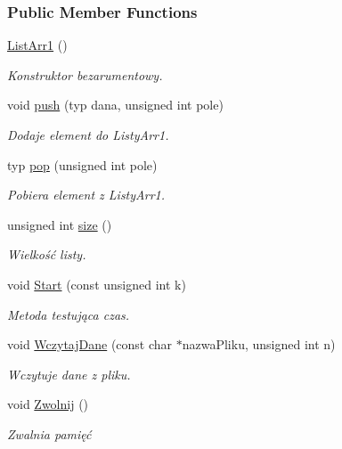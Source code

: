 \subsubsection*{Public Member Functions}
\begin{DoxyCompactItemize}
\item 
\hyperlink{class_list_arr1_adb0efe7b437d19a3cc7325b379f573bb}{List\-Arr1} ()
\begin{DoxyCompactList}\small\item\em Konstruktor bezarumentowy. \end{DoxyCompactList}\item 
void \hyperlink{class_list_arr1_a9b8bfbeae4e0b93ab47398d0282447b5}{push} (typ dana, unsigned int pole)
\begin{DoxyCompactList}\small\item\em Dodaje element do Listy\-Arr1. \end{DoxyCompactList}\item 
typ \hyperlink{class_list_arr1_acbc2f02d8ee4389cfd202beeddfae82c}{pop} (unsigned int pole)
\begin{DoxyCompactList}\small\item\em Pobiera element z Listy\-Arr1. \end{DoxyCompactList}\item 
unsigned int \hyperlink{class_list_arr1_a42b97b706c07e85f866bafd6ebc9b440}{size} ()
\begin{DoxyCompactList}\small\item\em Wielkość listy. \end{DoxyCompactList}\item 
void \hyperlink{class_list_arr1_a3af86b6f1d64d7a818faa726b83eb7e2}{Start} (const unsigned int k)
\begin{DoxyCompactList}\small\item\em Metoda testująca czas. \end{DoxyCompactList}\item 
void \hyperlink{class_list_arr1_a0a059d167f26e2498f3f4827f81841da}{Wczytaj\-Dane} (const char $\ast$nazwa\-Pliku, unsigned int n)
\begin{DoxyCompactList}\small\item\em Wczytuje dane z pliku. \end{DoxyCompactList}\item 
void \hyperlink{class_list_arr1_a613d2338847bd5d3b1383892d74280e7}{Zwolnij} ()
\begin{DoxyCompactList}\small\item\em Zwalnia pamięć \end{DoxyCompactList}\end{DoxyCompactItemize}
